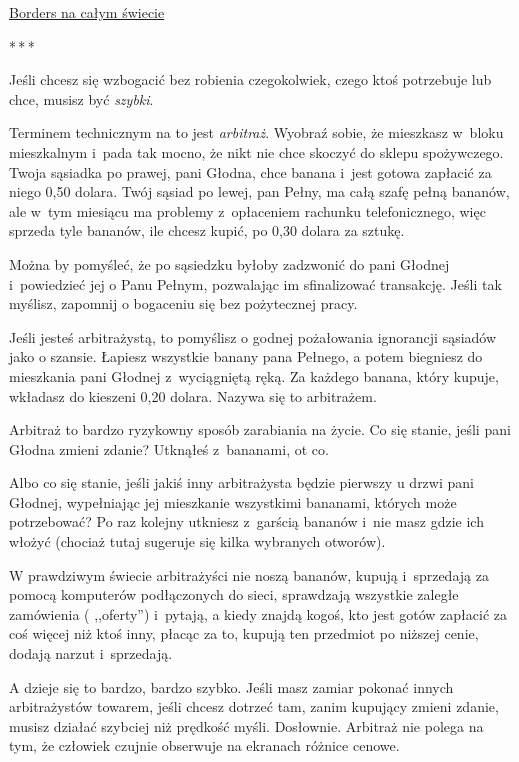 \documentclass[oneside,polish,11pt,rmheadings]{mwbk}
\newcommand{\threeast}{\par\centerline{*\,*\,*}\medskip\par}
\begin{document}
\href{https://en.wikipedia.org/wiki/HTTP_404}{Borders na całym świecie} 

\bigskip
\threeast

Jeśli chcesz się wzbogacić bez robienia czegokolwiek, czego ktoś potrzebuje lub chce, musisz być \textit{szybki}. 


Terminem technicznym na to jest \textit{arbitraż}. Wyobraź sobie, że mieszkasz w~bloku mieszkalnym i~pada tak mocno, że nikt nie chce skoczyć do sklepu spożywczego. Twoja sąsiadka po prawej, pani Głodna, chce banana i~jest gotowa zapłacić za niego 0,50 dolara. Twój sąsiad po lewej, pan Pełny, ma całą szafę pełną bananów, ale w~tym miesiącu ma problemy z~opłaceniem rachunku telefonicznego, więc sprzeda tyle bananów, ile chcesz kupić, po 0,30 dolara za sztukę. 


Można by pomyśleć, że po sąsiedzku byłoby zadzwonić do pani Głodnej i~powiedzieć jej o Panu Pełnym, pozwalając im sfinalizować transakcję. Jeśli tak myślisz, zapomnij o bogaceniu się bez pożytecznej pracy. 


Jeśli jesteś arbitrażystą, to pomyślisz o godnej pożałowania ignorancji sąsiadów jako o szansie. Łapiesz wszystkie banany pana Pełnego, a potem biegniesz do mieszkania pani Głodnej z~wyciągniętą ręką. Za każdego banana, który kupuje, wkładasz do kieszeni 0,20 dolara. Nazywa się to arbitrażem. 


Arbitraż to bardzo ryzykowny sposób zarabiania na życie. Co się stanie, jeśli pani Głodna zmieni zdanie? Utknąłeś z~bananami, ot co. 


Albo co się stanie, jeśli jakiś inny arbitrażysta będzie pierwszy u drzwi pani Głodnej, wypełniając jej mieszkanie wszystkimi bananami, których może potrzebować? Po raz kolejny utkniesz z~garścią bananów i~nie masz gdzie ich włożyć (chociaż tutaj sugeruje się kilka wybranych otworów). 


W prawdziwym świecie arbitrażyści nie noszą bananów, kupują i~sprzedają za pomocą komputerów podłączonych do sieci, sprawdzają wszystkie zaległe zamówienia ( ,,oferty'') i~pytają, a kiedy znajdą kogoś, kto jest gotów zapłacić za coś więcej niż ktoś inny, płacąc za to, kupują ten przedmiot po niższej cenie, dodają narzut i~sprzedają. 


A dzieje się to bardzo, bardzo szybko. Jeśli masz zamiar pokonać innych arbitrażystów towarem, jeśli chcesz dotrzeć tam, zanim kupujący zmieni zdanie, musisz działać szybciej niż prędkość myśli. Dosłownie. Arbitraż nie polega na tym, że człowiek czujnie obserwuje na ekranach różnice cenowe. 
\end{document}
